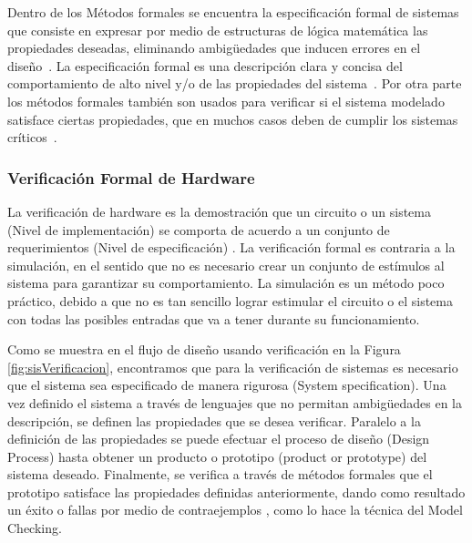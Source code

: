 Dentro de los M\'etodos formales se encuentra la especificaci\'on formal de 
sistemas que consiste en expresar por medio de estructuras de l\'ogica 
matem\'atica las propiedades deseadas, eliminando ambig\"uedades que inducen 
errores en el dise\~no~\cite{Clarke1996}. La especificaci\'on formal es 
una descripci\'on clara y concisa del comportamiento de alto nivel y/o de las 
propiedades del sistema~\cite{Kropf1999}. Por otra parte los m\'etodos 
formales tambi\'en son usados para verificar si el sistema modelado satisface 
ciertas propiedades, que en muchos casos deben de cumplir los sistemas 
cr\'iticos~\cite{Clarke1996}.

\subsubsection{Verificaci\'on Formal de Hardware}

La verificaci\'on de hardware es la demostraci\'on que un circuito o un sistema 
(Nivel de implementaci\'on) se comporta de acuerdo a un conjunto de 
requerimientos (Nivel de especificaci\'on) \cite{Kropf1999}. La 
verificaci\'on formal es contraria a la simulaci\'on, en el sentido que no es 
necesario crear un conjunto de est\'imulos al sistema para garantizar su 
comportamiento. La simulaci\'on es un m\'etodo poco pr\'actico, debido a que no 
es tan sencillo lograr estimular el circuito o el sistema con todas las posibles 
entradas que va a tener durante su funcionamiento. 

Como se muestra en el flujo de dise\~no usando verificaci\'on en la Figura 
\ref{fig:sisVerificacion}, encontramos que para la verificaci\'on de sistemas 
es necesario que el sistema sea especificado de manera rigurosa (System 
specification). Una vez definido el sistema a trav\'es de lenguajes que no 
permitan ambig\"uedades en la descripci\'on,  se definen las propiedades que se 
desea verificar. Paralelo a la definici\'on de las propiedades se puede efectuar 
el proceso de dise\~no (Design Process) hasta obtener un producto o prototipo 
(product or prototype) del sistema deseado. Finalmente, se verifica a trav\'es 
de m\'etodos formales que el prototipo satisface las propiedades definidas 
anteriormente, dando como resultado un \'exito o fallas por medio de 
contraejemplos \cite{Vaovic2005}, como lo hace la t\'ecnica del Model 
Checking.

